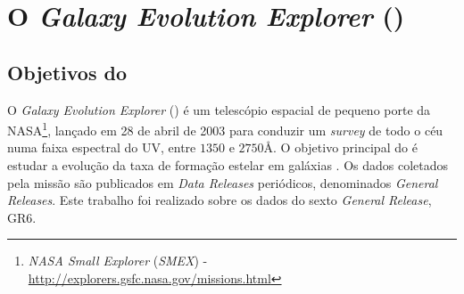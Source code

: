 


\chapter{O {\em Galaxy Evolution Explorer} (\galex)}
\label{sec:Galex}



\section{Objetivos do \galex}
\label{sec:Galex:Objetivos}

O {\em Galaxy Evolution Explorer} (\galex) é um telescópio espacial de pequeno
porte da NASA\footnote{{\em NASA Small Explorer} ({\em SMEX}) -
\url{http://explorers.gsfc.nasa.gov/missions.html}}, lançado em 28 de abril de
2003 para conduzir um {\em survey} de todo o céu numa faixa espectral do UV,
entre $1350$ e $2750$\AA. O objetivo principal do \galex é estudar a evolução da
taxa de formação estelar em galáxias \citep{Martin2005}. Os dados coletados pela
missão são publicados em {\em Data Releases} periódicos, denominados {\em
General Releases}. Este trabalho foi realizado sobre os dados do sexto {\em
General Release}, GR6.

